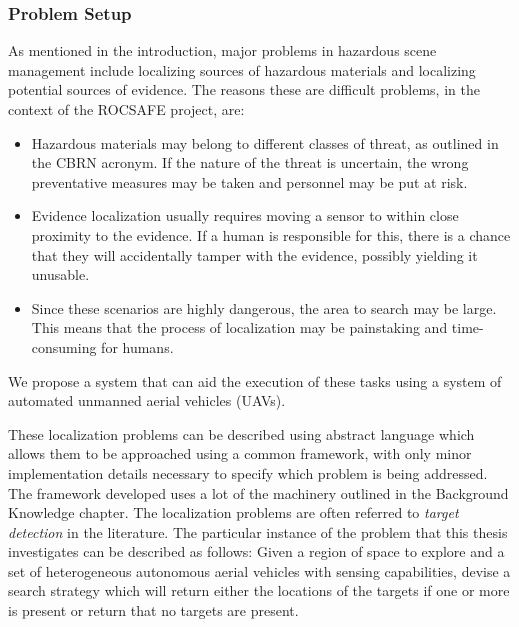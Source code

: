 \subsubsection{Problem Setup}
As mentioned in the introduction, major problems in hazardous scene management include localizing sources of hazardous materials and localizing potential sources of evidence. The reasons these are difficult problems, in the context of the ROCSAFE project, are:
\begin{itemize}
    \item Hazardous materials may belong to different classes of threat, as outlined in the CBRN acronym. If the nature of the threat is uncertain, the wrong preventative measures may be taken and personnel may be put at risk. 
    \item Evidence localization usually requires moving a sensor to within close proximity to the evidence. If a human is responsible for this, there is a chance that they will accidentally tamper with the evidence, possibly yielding it unusable.
    \item Since these scenarios are highly dangerous, the area to search may be large. This means that the process of localization may be painstaking and time-consuming for humans.
\end{itemize}
We propose a system that can aid the execution of these tasks using a system of automated unmanned aerial vehicles (UAVs). \par

These localization problems can be described using abstract language which allows them to be approached using a common framework, with only minor implementation details necessary to specify which problem is being addressed. The framework developed uses a lot of the machinery outlined in the Background Knowledge chapter. The localization problems are often referred to \textit{target detection} in the literature. The particular instance of the problem that this thesis investigates can be described as follows:
Given a region of space to explore and a set of heterogeneous autonomous aerial vehicles with sensing capabilities, devise a search strategy which will return either the locations of the targets if one or more is present or return that no targets are present. %
\par

